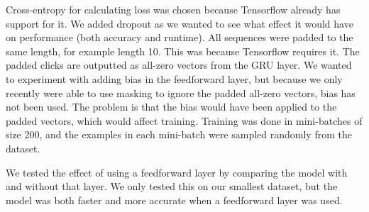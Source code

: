 Cross-entropy for calculating loss was chosen because Tensorflow already has support for it. We added dropout as we wanted to see what effect it would have on performance (both accuracy and runtime). All sequences were padded to the same length, for example length 10. This was because Tensorflow requires it. The padded clicks are outputted as all-zero vectors from the GRU layer. We wanted to experiment with adding bias in the feedforward layer, but because we only recently were able to use masking to ignore the padded all-zero vectors, bias has not been used. The problem is that the bias would have been applied to the padded vectors, which would affect training. Training was done in mini-batches of size 200, and the examples in each mini-batch were sampled randomly from the dataset.

We tested the effect of using a feedforward layer by comparing the model with and without that layer. We only tested this on our smallest dataset, but the model was both faster and more accurate when a feedforward layer was used. 
